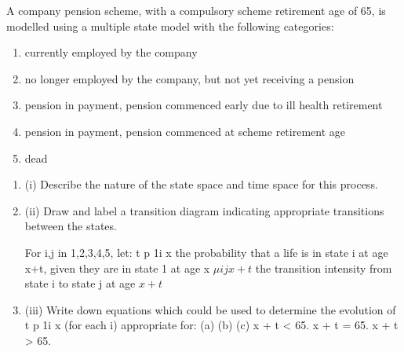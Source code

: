 \documentclass[a4paper,12pt]{article}
\begin{document}
A company pension scheme, with a compulsory scheme retirement age of 65, is
modelled using a multiple state model with the following categories:


\begin{enumerate}
    \item currently employed by the company
    \item no longer employed by the company, but not yet receiving a pension
    \item pension in payment, pension commenced early due to ill health retirement
    \item pension in payment, pension commenced at scheme retirement age
    \item dead
\end{enumerate} 

\begin{enumerate}
\item (i) Describe the nature of the state space and time space for this process.
\item (ii) Draw and label a transition diagram indicating appropriate transitions between
the states.


\medskip 

For i,j in {1,2,3,4,5}, let:
t
p 1i x
the probability that a life is in state i at age x+t, given they are in state 1 at age
x
$\mu ijx + t$ the transition intensity from state i to state j at age $x+t$
\item (iii) Write down equations which could be used to determine the evolution of t p 1i x
(for each i) appropriate for:
(a)
(b)
(c)
x + t < 65.
x + t = 65.
x + t > 65.
\end{enumerate}

\newpage
\end{document}
